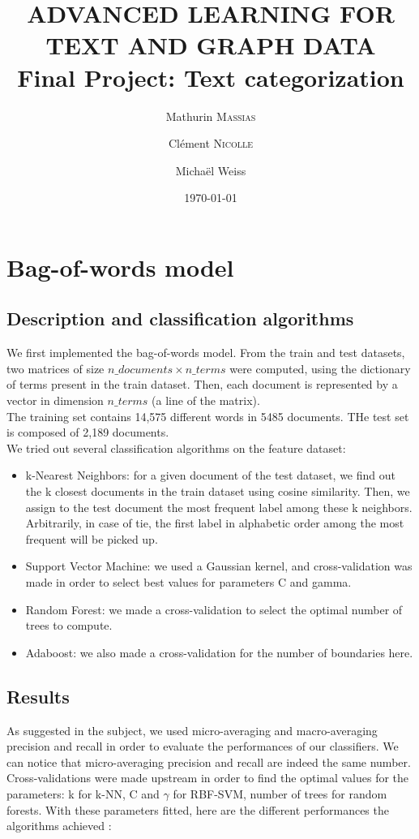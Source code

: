 \documentclass[11pt,a4paper]{article}
\title{ADVANCED LEARNING FOR TEXT AND GRAPH DATA \\ Final Project: Text categorization}
\author{Mathurin \textsc{Massias} \and Clément \textsc{Nicolle} \and Michaël Weiss}
\date{\today}
\begin{document}
	
\maketitle

\section{Bag-of-words model}

\subsection{Description and classification algorithms}

We first implemented the bag-of-words model. From the train and test datasets, two matrices of size $n\_documents \times n\_terms$ were computed, using the dictionary of terms present in the train dataset. Then, each document is represented by a vector in dimension $n\_terms$ (a line of the matrix).
\\The training set contains 14,575 different words in 5485 documents. THe test set is composed of 2,189 documents.
\\We tried out several classification algorithms on the feature dataset:
\begin{itemize}
	\item k-Nearest Neighbors: for a given document of the test dataset, we find out the k closest documents in the train dataset using cosine similarity. Then, we assign to the test document the most frequent label among these k neighbors. Arbitrarily, in case of tie, the first label in alphabetic order among the most frequent will be picked up.
	\item Support Vector Machine: we used a Gaussian kernel, and cross-validation was made in order to select best values for parameters C and gamma.
	\item Random Forest: we made a cross-validation to select the optimal number of trees to compute.
	\item Adaboost: we also made a cross-validation for the number of boundaries here.
\end{itemize}


\subsection{Results}

As suggested in the subject, we used micro-averaging and macro-averaging precision and recall in order to evaluate the performances of our classifiers. We can notice that micro-averaging precision and recall are indeed the same number.
\\Cross-validations were made upstream in order to find the optimal values for the parameters: k for k-NN, C and $\gamma$ for RBF-SVM, number of trees for random forests. With these parameters fitted, here are the different performances the algorithms achieved :
\end{document}
